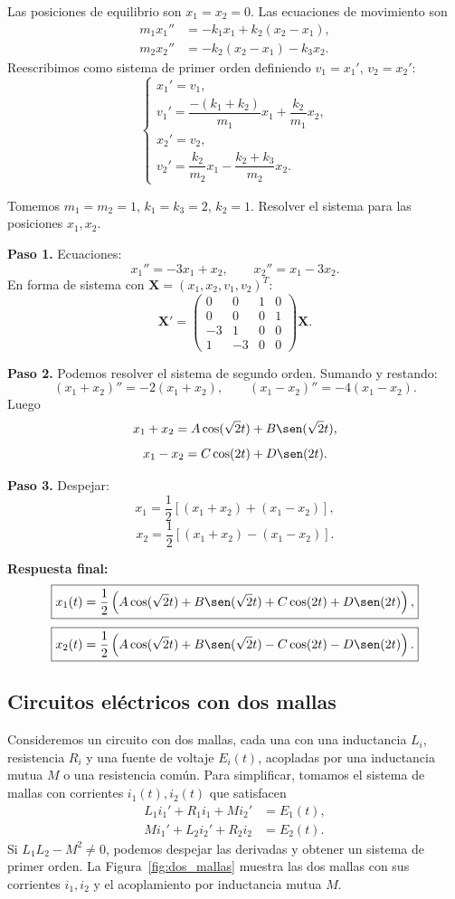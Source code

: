 Las posiciones de equilibrio son $x_1=x_2=0$. Las ecuaciones de movimiento son
\[
\begin{aligned}
m_1 x_1'' &= -k_1 x_1 + k_2(x_2-x_1),\\
m_2 x_2'' &= -k_2(x_2-x_1) - k_3 x_2.
\end{aligned}
\]
Reescribimos como sistema de primer orden definiendo $v_1=x_1'$, $v_2=x_2'$:
\[
\begin{cases}
x_1'=v_1,\\
v_1'=\dfrac{-(k_1+k_2)}{m_1}x_1+\dfrac{k_2}{m_1}x_2,\\
x_2'=v_2,\\
v_2'=\dfrac{k_2}{m_2}x_1-\dfrac{k_2+k_3}{m_2}x_2.
\end{cases}
\]

\begin{example}
Tomemos $m_1=m_2=1$, $k_1=k_3=2$, $k_2=1$. Resolver el sistema para las posiciones $x_1,x_2$.
\begin{myproof}
\textbf{Paso 1.} Ecuaciones:
\[
x_1''=-3x_1+x_2,\qquad x_2''=x_1-3x_2.
\]
En forma de sistema con $\mathbf{X}=(x_1,x_2,v_1,v_2)^T$:
\[
\mathbf{X}'=
\begin{pmatrix}
0&0&1&0\\
0&0&0&1\\
-3&1&0&0\\
1&-3&0&0
\end{pmatrix}\mathbf{X}.
\]

\textbf{Paso 2.} Podemos resolver el sistema de segundo orden. Sumando y restando:
\[
(x_1+x_2)''=-2(x_1+x_2),\qquad (x_1-x_2)''=-4(x_1-x_2).
\]
Luego
\[
x_1+x_2=A\cos(\sqrt{2}t)+B\sen(\sqrt{2}t),
\]
\[
x_1-x_2=C\cos(2t)+D\sen(2t).
\]

\textbf{Paso 3.} Despejar:
\[
x_1=\frac12[(x_1+x_2)+(x_1-x_2)],
\]
\[
x_2=\frac12[(x_1+x_2)-(x_1-x_2)].
\]

\textbf{Respuesta final:}
\[
\boxed{
x_1(t)=\frac12\left(A\cos(\sqrt{2}t)+B\sen(\sqrt{2}t)+C\cos(2t)+D\sen(2t)\right),
}
\]
\[
\boxed{
x_2(t)=\frac12\left(A\cos(\sqrt{2}t)+B\sen(\sqrt{2}t)-C\cos(2t)-D\sen(2t)\right).
}
\]
\end{myproof}
\end{example}

\subsection{Circuitos eléctricos con dos mallas}

Consideremos un circuito con dos mallas, cada una con una inductancia $L_i$, resistencia $R_i$ y una fuente de voltaje $E_i(t)$, acopladas por una inductancia mutua $M$ o una resistencia común. Para simplificar, tomamos el sistema de mallas con corrientes $i_1(t), i_2(t)$ que satisfacen
\[
\begin{aligned}
L_1 i_1' + R_1 i_1 + M i_2' &= E_1(t),\\
M i_1' + L_2 i_2' + R_2 i_2 &= E_2(t).
\end{aligned}
\]
Si $L_1L_2-M^2\neq 0$, podemos despejar las derivadas y obtener un sistema de primer orden. La Figura~\ref{fig:dos_mallas} muestra las dos mallas con sus corrientes $i_1,i_2$ y el acoplamiento por inductancia mutua $M$.

